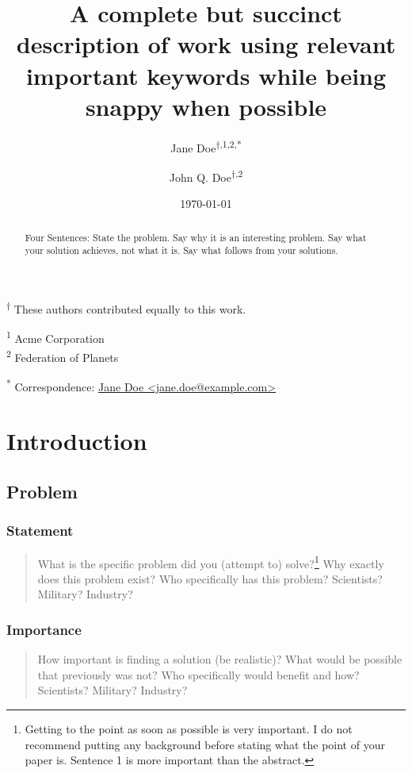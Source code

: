 \documentclass[
  10pt,
  draftcls,
  technote,
  letterpaper,
  oneside,
  onecolumn]{IEEEtran}
\title{A complete but succinct description of work using relevant
important keywords while being snappy when possible}
\author{Jane Doe\textsuperscript{$\dagger{}$,1,2,*} \and John Q. Doe\textsuperscript{$\dagger{}$,2}}
\date{\today}
\begin{document}
\maketitle
\begin{abstract}
Four Sentences: State the problem. Say why it is an interesting problem.
Say what your solution achieves, not what it is. Say what follows from
your solutions.
\end{abstract}

\textsuperscript{$\dagger{}$}
These authors contributed equally to this work.

\textsuperscript{1} Acme Corporation\\
\textsuperscript{2} Federation of Planets

\textsuperscript{*} Correspondence:
\href{mailto:jane.doe@example.com}{Jane Doe
\textless{}jane.doe@example.com\textgreater{}}

\hypertarget{introduction}{%
\section{Introduction}\label{introduction}}

\hypertarget{problem}{%
\subsection{Problem}\label{problem}}

\hypertarget{statement}{%
\subsubsection{Statement}\label{statement}}

\begin{quote}
What is the specific problem did you (attempt to) solve?\footnote{Getting
  to the point as soon as possible is very important. I do not recommend
  putting any background before stating what the point of your paper is.
  Sentence 1 is more important than the abstract.} Why exactly does this
problem exist? Who specifically has this problem? Scientists? Military?
Industry?
\end{quote}

\hypertarget{importance}{%
\subsubsection{Importance}\label{importance}}

\begin{quote}
How important is finding a solution (be realistic)? What would be
possible that previously was not? Who specifically would benefit and
how? Scientists? Military? Industry?
\end{quote}
\end{document}
